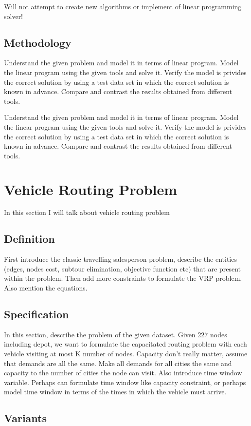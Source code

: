 \documentclass[a4paper, 12pt]{report}
\begin{document}
Will not attempt to create new algorithms or implement of linear programming solver!

\section{Methodology}
Understand the given problem and model it in terms of linear program. Model the linear program using the given tools and solve it. Verify the model is privides the correct solution by using a test data set in which the correct solution is known in advance. Compare and contrast the results obtained from different tools.

Understand the given problem and model it in terms of linear program. Model the linear program using the given tools and solve it. Verify the model is privides the correct solution by using a test data set in which the correct solution is known in advance. Compare and contrast the results obtained from different tools.

\chapter{Vehicle Routing Problem}
In this section I will talk about vehicle routing problem
\section{Definition}
First introduce the classic travelling salesperson problem, describe the entities (edges, nodes cost, subtour elimination, objective function etc) that are present within the problem. Then add more constraints to formulate the VRP problem. Also mention the equations.

\section{Specification}
In this section, describe the problem of the given dataset. Given 227 nodes including depot, we want to formulate the capacitated routing problem with each vehicle visiting at most K number of nodes. Capacity don’t really matter, assume that demands are all the same. Make all demands for all cities the same and capacity to the number of cities the node can visit. Also introduce time window variable. Perhaps can formulate time window like  capacity constraint, or perhaps model time window in terms of the times in which the vehicle must arrive.

\section{Variants}
\end{document}
